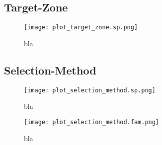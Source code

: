     \subsection{Target-Zone} %
        \label{sub:target_results}
        \begin{figure}[H]
            \centering
            \texttt{[image: plot\_target\_zone.sp.png]}
            \caption{bla}
            \label{fig:target_zone.sp}
        \end{figure}

    \subsection{Selection-Method} %
        \label{sub:selection_results}
        \begin{figure}[H]
            \centering
            \texttt{[image: plot\_selection\_method.sp.png]}
            \caption{bla}
            \label{fig:selection_method.sp}
        \end{figure}
        \begin{figure}[H]
            \centering
            \texttt{[image: plot\_selection\_method.fam.png]}
            \caption{bla}
            \label{fig:selection_method.fam}
        \end{figure}
